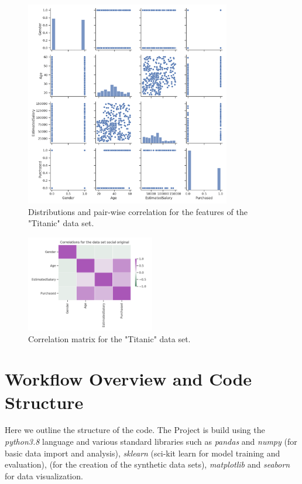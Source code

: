\documentclass{article}
\begin{document}
\begin{figure}[h!]
	\centering
	\includegraphics[width=0.8\textwidth]{../plots/social_pairplot_original.png}
	\caption{ Distributions and pair-wise correlation for the features of the "Titanic" data set.}
	\label{pairplot_income}
\end{figure}


\begin{figure}[h!]
	\centering
	\includegraphics[width=0.5\textwidth]{../plots/social_correlations_original.png}
	\caption{Correlation matrix for the "Titanic" data set. }
	\label{correlation_income}
\end{figure}


\section{Workflow Overview and Code Structure}
Here we outline the structure of the code. The Project is build using the \textit{python3.8} language and various standard libraries such as \textit{pandas} and \textit{numpy} (for basic data import and analysis), \textit{sklearn} (sci-kit learn for model training and evaluation), \textit{} (for the creation of the synthetic data sets), \textit{matplotlib} and \textit{seaborn} for data visualization. 
\end{document}

